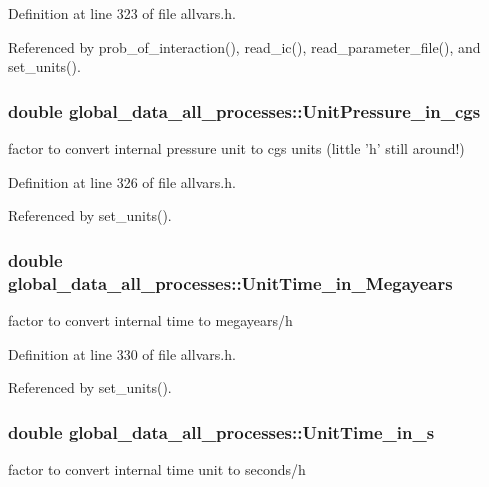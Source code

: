 Definition at line 323 of file allvars.h.



Referenced by prob\_\-of\_\-interaction(), read\_\-ic(), read\_\-parameter\_\-file(), and set\_\-units().

\hypertarget{structglobal__data__all__processes_a4938f30bc3da1d4583d42f806ad11201}{
\subsubsection[{UnitPressure\_\-in\_\-cgs}]{\setlength{\rightskip}{0pt plus 5cm}double {\bf global\_\-data\_\-all\_\-processes::UnitPressure\_\-in\_\-cgs}}}
\label{structglobal__data__all__processes_a4938f30bc3da1d4583d42f806ad11201}
factor to convert internal pressure unit to cgs units (little 'h' still around!) 

Definition at line 326 of file allvars.h.



Referenced by set\_\-units().

\hypertarget{structglobal__data__all__processes_a833ed48234b2780d7a668ae90c84318e}{
\subsubsection[{UnitTime\_\-in\_\-Megayears}]{\setlength{\rightskip}{0pt plus 5cm}double {\bf global\_\-data\_\-all\_\-processes::UnitTime\_\-in\_\-Megayears}}}
\label{structglobal__data__all__processes_a833ed48234b2780d7a668ae90c84318e}
factor to convert internal time to megayears/h 

Definition at line 330 of file allvars.h.



Referenced by set\_\-units().

\hypertarget{structglobal__data__all__processes_a4fa94d45bad042101623c3403f6b8c37}{
\subsubsection[{UnitTime\_\-in\_\-s}]{\setlength{\rightskip}{0pt plus 5cm}double {\bf global\_\-data\_\-all\_\-processes::UnitTime\_\-in\_\-s}}}
\label{structglobal__data__all__processes_a4fa94d45bad042101623c3403f6b8c37}
factor to convert internal time unit to seconds/h 


